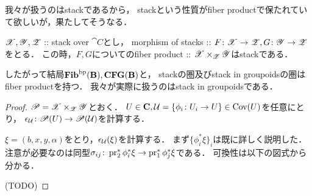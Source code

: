 \documentclass[a4paper, dvipdfmx]{jsarticle}
\begin{document}
我々が扱うのはstackであるから，
stackという性質がfiber productで保たれていて欲しいが，果たしてそうなる．
\begin{Prop}
    $\mathscr{X}, \mathscr{Y}, \mathscr{Z}$ :: stack over $\cat{C}$とし，
    morphism of stacks :: $F \colon \mathscr{X} \to \mathscr{Z}, G \colon \mathscr{Y} \to \mathscr{Z}$をとる．
    この時，$F, G$についてのfiber product :: $\mathscr{X} \times_{\mathscr{Z}} \mathscr{Y}$はstackである．
\end{Prop}
したがって結局$\mathbf{Fib}^{\mathrm{bp}}(\mathbf{B}), \mathbf{CFG}(\mathbf{B})$と，
stackの圏及びstack in groupoidsの圏はfiber productを持つ．
我々が実際に扱うのはstack in groupoidsである．
\begin{proof}
    $\mathscr{P}=\mathscr{X} \times_{\mathscr{Z}} \mathscr{Y}$とおく．
    $U \in \mathbf{C}, \mathcal{U}=\{\phi_i \colon U_i \to U\} \in \operatorname{Cov}(U)$を任意にとり，
    $\epsilon_{\mathcal{U}} \colon \mathscr{P}(U) \to \mathscr{P}(\mathcal{U})$を計算する．

    $\xi=(b, x, y, \alpha)$をとり，$\epsilon_{\mathcal{U}}(\xi)$を計算する．
    まず$\{\phi_i^*\xi\}_i$は既に詳しく説明した．
    注意が必要なのは同型$\sigma_{ij} \colon \operatorname{pr}_2^*\phi_i^*\xi \to \operatorname{pr}_1^*\phi_j^*\xi$である．
    可換性は以下の図式から分かる．
    \begin{center}
    \end{center}
    
    (TODO)

\end{proof}
\end{document}
